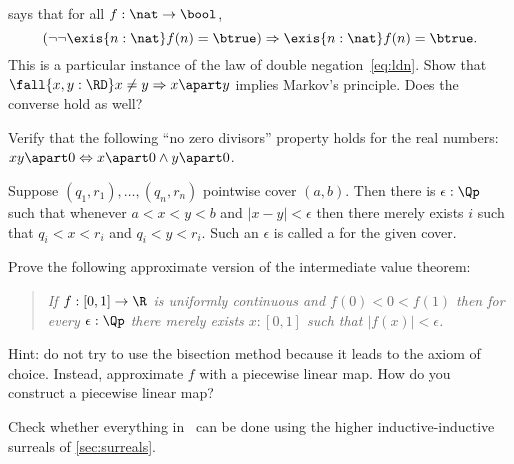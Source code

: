 %

\begin{ex} \label{ex:reals-apart-neq-MP}
  says that for all $f : \nat \to \bool$,
  \begin{equation*}
    (\lnot \lnot \exis{n : \nat} f(n) = \btrue)
    \Rightarrow
    \exis{n : \nat} f(n) = \btrue.
  \end{equation*}
  This is a particular instance of the law of double negation~\eqref{eq:ldn}. Show that
  $\fall{x, y: \RD} x \neq y \Rightarrow x \apart y$ implies Markov's principle. Does the
  converse hold as well?
\end{ex}

\begin{ex} \label{ex:reals-apart-zero-divisors}
  Verify that the following ``no zero divisors'' property holds for the real numbers:
  $x y \apart 0 \Leftrightarrow x \apart 0 \land y \apart 0$.
\end{ex}

\begin{ex} \label{ex:finite-cover-lebesgue-number}
  Suppose $(q_1, r_1), \ldots, (q_n, r_n)$ pointwise cover $(a, b)$. Then there is
  $\epsilon : \Qp$ such that whenever $a < x < y < b$ and $|x - y| < \epsilon$
  then there merely exists $i$ such that $q_i < x < r_i$ and $q_i < y < r_i$. Such an
  $\epsilon$ is called a 
  for the given cover.
\end{ex}

\begin{ex} \label{ex:mean-value-theorem}
  Prove the following approximate version of the intermediate value theorem:
  \begin{quote}
    \emph{
      If $f : [0,1] \to \R$ is uniformly continuous and $f(0) < 0 < f(1)$ then
      for every $\epsilon : \Qp$ there merely exists $x : [0,1]$ such that $|f(x)| <
      \epsilon$.
    }
  \end{quote}
  Hint: do not try to use the bisection method because it leads to the axiom of choice.
  Instead, approximate $f$ with a piecewise linear map. How do you construct a piecewise
  linear map?
\end{ex}

\begin{ex}\label{ex:knuth-surreal-check}
  Check whether everything in~\cite{knuth74:_surreal_number} can be done using the higher
  inductive-inductive surreals of \cref{sec:surreals}.
\end{ex}

